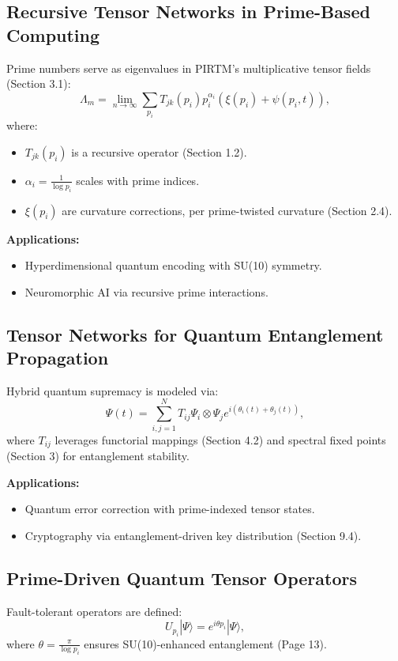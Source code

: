 \documentclass{article}
\theoremstyle{plain}
\begin{document}
\subsection{Recursive Tensor Networks in Prime-Based Computing}
Prime numbers serve as eigenvalues in PIRTM’s multiplicative tensor fields (Section 3.1):
\begin{equation}
\Lambda_m = \lim_{n\to\infty} \sum_{p_i} T_{jk}(p_i) p_i^{\alpha_i} (\xi(p_i) + \psi(p_i, t)),
\end{equation}
where:
\begin{itemize}
    \item \( T_{jk}(p_i) \) is a recursive operator (Section 1.2).
    \item \( \alpha_i = \frac{1}{\log p_i} \) scales with prime indices.
    \item \( \xi(p_i) \) are curvature corrections, per prime-twisted curvature (Section 2.4).
\end{itemize}
\textbf{Applications:}
\begin{itemize}
    \item Hyperdimensional quantum encoding with SU(10) symmetry.
    \item Neuromorphic AI via recursive prime interactions.
\end{itemize}

\subsection{Tensor Networks for Quantum Entanglement Propagation}
Hybrid quantum supremacy is modeled via:
\begin{equation}
\Psi(t) = \sum_{i,j=1}^{N} T_{ij} \Psi_i \otimes \Psi_j e^{i(\theta_i(t) + \theta_j(t))},
\end{equation}
where \( T_{ij} \) leverages functorial mappings (Section 4.2) and spectral fixed points (Section 3) for entanglement stability.

\textbf{Applications:}
\begin{itemize}
    \item Quantum error correction with prime-indexed tensor states.
    \item Cryptography via entanglement-driven key distribution (Section 9.4).
\end{itemize}

\subsection{Prime-Driven Quantum Tensor Operators}
Fault-tolerant operators are defined:
\begin{equation}
U_{p_i} |\Psi\rangle = e^{i \theta p_i} |\Psi\rangle,
\end{equation}
where \( \theta = \frac{\pi}{\log p_i} \) ensures SU(10)-enhanced entanglement (Page 13).
\end{document}
